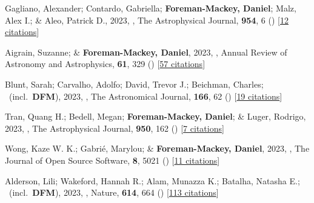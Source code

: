 \item[{\color{numcolor}\scriptsize98}] Gagliano, Alexander; Contardo, Gabriella; \textbf{Foreman-Mackey, Daniel}; Malz, Alex I.; \& Aleo, Patrick D., 2023, , The Astrophysical Journal, \textbf{954}, 6 () [\href{https://ui.adsabs.harvard.edu/abs/2023ApJ...954....6G}{12 citations}]

\item[{\color{numcolor}\scriptsize97}] Aigrain, Suzanne; \& \textbf{Foreman-Mackey, Daniel}, 2023, , Annual Review of Astronomy and Astrophysics, \textbf{61}, 329 () [\href{https://ui.adsabs.harvard.edu/abs/2023ARA&A..61..329A}{57 citations}]

\item[{\color{numcolor}\scriptsize96}] Blunt, Sarah; Carvalho, Adolfo; David, Trevor J.; Beichman, Charles; \etal\ (incl.\ \textbf{DFM}), 2023, , The Astronomical Journal, \textbf{166}, 62 () [\href{https://ui.adsabs.harvard.edu/abs/2023AJ....166...62B}{19 citations}]

\item[{\color{numcolor}\scriptsize95}] Tran, Quang H.; Bedell, Megan; \textbf{Foreman-Mackey, Daniel}; \& Luger, Rodrigo, 2023, , The Astrophysical Journal, \textbf{950}, 162 () [\href{https://ui.adsabs.harvard.edu/abs/2023ApJ...950..162T}{7 citations}]

\item[{\color{numcolor}\scriptsize94}] Wong, Kaze W. K.; Gabri{\'e}, Marylou; \& \textbf{Foreman-Mackey, Daniel}, 2023, , The Journal of Open Source Software, \textbf{8}, 5021 () [\href{https://ui.adsabs.harvard.edu/abs/2023JOSS....8.5021W}{11 citations}]

\item[{\color{numcolor}\scriptsize93}] Alderson, Lili; Wakeford, Hannah R.; Alam, Munazza K.; Batalha, Natasha E.; \etal\ (incl.\ \textbf{DFM}), 2023, , Nature, \textbf{614}, 664 () [\href{https://ui.adsabs.harvard.edu/abs/2023Natur.614..664A}{113 citations}]

